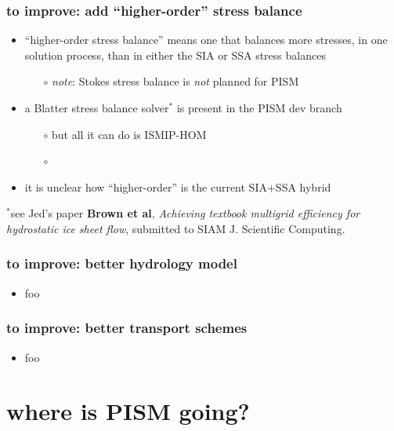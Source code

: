 \documentclass[hide notes,intlimits]{beamer}
\begin{document}
\begin{frame}
  \frametitle{to improve: add ``higher-order'' stress balance}
  \begin{itemize}
  \item ``higher-order stress balance'' means one that balances more stresses, in one solution process, than in either the SIA or SSA stress balances
    \begin{itemize}
    \item[$\circ$]  \emph{note}: Stokes stress balance is \emph{not} planned for PISM
    \end{itemize}
  \item a Blatter stress balance solver$^{*}$ is present in the PISM dev branch
    \begin{itemize}
    \item[$\circ$] but all it can do is ISMIP-HOM
    \item[$\circ$]
    \end{itemize}    
  \item it is unclear how ``higher-order'' is the current SIA+SSA hybrid
  \end{itemize}

 \begin{flushleft}
   \scriptsize
    $^{*}$see Jed's paper \textbf{Brown et al},
    \emph{Achieving textbook multigrid efficiency for hydrostatic ice sheet
      flow}, submitted to SIAM J. Scientific Computing.
  \end{flushleft}
\end{frame}


\begin{frame}
  \frametitle{to improve: better hydrology model}
  \begin{itemize}
  \item foo
  \end{itemize}
\end{frame}


\begin{frame}
  \frametitle{to improve: better transport schemes}
  \begin{itemize}
  \item foo
  \end{itemize}
\end{frame}


\section[where to?]{where is PISM going?}
\end{document}
